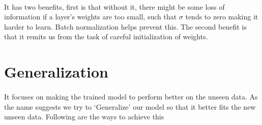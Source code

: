 \documentclass{article}
\begin{document}
    \paragraph{} It has two benefits, first is that without it, there might be some loss of information if a layer’s weights are too small, such that $\sigma$ tends to zero making it harder to learn. Batch normalization helps prevent this. The second benefit is that it remits us from the task of careful initialization of weights.


\section{Generalization}
    \paragraph{} It focuses on making the trained model to perform better on the unseen data. As the name suggests we try to ‘Generalize’ our model so that it better fits the new unseen data. Following are the ways to achieve this
\end{document}
